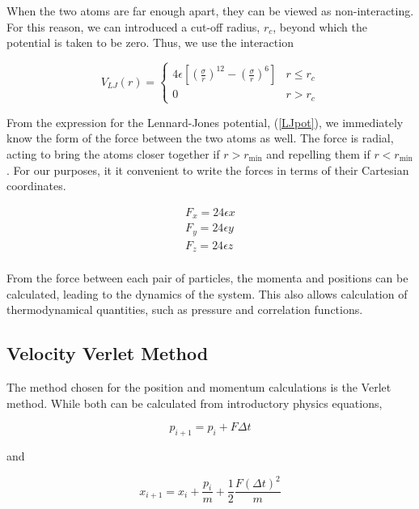 \documentclass{article}
\begin{document}
\begin{multicols}{2}
When the two atoms are far enough apart, they can be viewed as non-interacting.  For this reason, we can introduced a cut-off radius, $r_c$, beyond which the potential is taken to be zero.  Thus, we use the interaction 

\begin{equation}
V_{LJ} (r) = \begin{cases}
4 \epsilon \left [ \left (\frac{\sigma}{r} \right )^{12} - \left (\frac{\sigma}{r} \right )^{6} \right ] & r \le r_c \\
0 & r > r_c
\end{cases}
\end{equation}

From the expression for the Lennard-Jones potential, (\ref{LJpot}), we immediately know the form of the force between the two atoms as well.  The force is radial, acting to bring the atoms closer together if $r > r_{\mathrm{min}}$ and repelling them if $r < r_{\mathrm{min}}$.  For our purposes, it it convenient to write the forces in terms of their Cartesian coordinates.  

\begin{equation}
\begin{split}
F_x = 24\epsilon x \\
F_y = 24 \epsilon y\\
F_z = 24 \epsilon z \\
\end{split}
\end{equation}

\noindent From the force between each pair of particles, the momenta and positions can be calculated, leading to the dynamics of the system.  This also allows calculation of thermodynamical quantities, such as pressure and correlation functions.\\

\subsection{Velocity Verlet Method}

The method chosen for the position and momentum calculations is the Verlet method.  While both can be calculated from introductory physics equations,

\begin{equation}
\label{momeqn}
p_{i+1}=p_i + F \Delta t
\end{equation}

\noindent and

\begin{equation}
\label{poseqn}
x_{i+1} = x_i + \frac{p_i}{m} + \frac{1}{2}\frac{F(\Delta t)^2}{m}
\end{equation}


\end{multicols}
\end{document}
